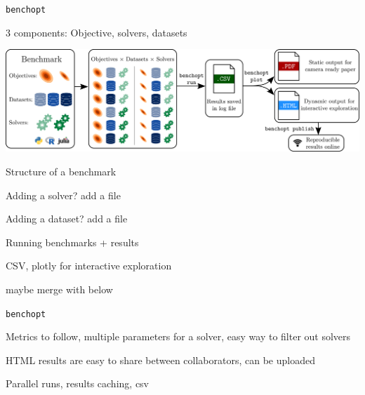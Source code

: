 \documentclass[unknownkeysallowed]{beamer}
\begin{document}
\begin{frame}{\texttt{benchopt}}

    3 components: Objective, solvers, datasets

    \includegraphics[width=\linewidth]{../sharedimages/benchopt_schema.pdf}

\end{frame}


\begin{frame}{Structure of a benchmark}

    \begin{minipage}{0.45\linewidth}
    \end{minipage}

    Adding a solver? add a file

    Adding a dataset? add a file

\end{frame}

\begin{frame}{Running benchmarks + results}

    CSV, plotly for interactive exploration

    maybe merge with below
\end{frame}


\begin{frame}{\texttt{benchopt}}

    Metrics to follow, multiple parameters for a solver, easy way to filter out solvers

    HTML results are easy to share between collaborators, can be uploaded

    Parallel runs, results caching, csv
\end{frame}
\end{document}
